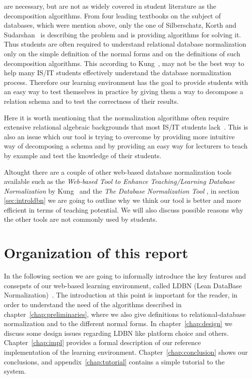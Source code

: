 are necessary, but are not as widely covered in student literature as the 
decomposition algorithms. From four leading textbooks on the subject of 
databases, which were mention above, only the one of Silberschatz, Korth and Sudarshan~\cite{bdb4}
is describing the problem and is providing algorithms for solving it. Thus students 
are often required to understand relational database normalization only on the 
simple definition of the normal forms and on the definitions of such decomposition
algorithms. This according to Kung~\cite{p8}, may not be the best way to help many 
IS/IT students effectively understand the database normalization process. Therefore
our learning environment has the goal to provide students with an easy way 
to test themselves
in practice by giving them a way to decompose a relation schema and to 
test the correctness of their results. 

Here it is worth mentioning that the normalization algorithms often require 
extensive relational algebraic backgrounds that most IS/IT students lack~\cite{p8}. This
is also an issue which our tool is trying to overcome by providing more intuitive 
way of decomposing a schema and by providing an easy way for lecturers to
teach by example and test the knowledge of their students. 

Altought there are a couple of other web-based database normalization tools 
available such as the \textit{Web-based Tool to Enhance Teaching/Learning Database 
Normalization} by Kung~\cite{p8} and the \textit{The Database Normalization Tool}
\cite{w1}, 
in section \ref{sec:introldbn} we are going to outline why we think our tool is better 
and more efficient
in terms of teaching potential. We will also discuss possible reasons why the 
other tools are not commonly used by students. 

\section{Organization of this report}
\label{sec:organization}
In the following section we are going to informally introduce 
the key features and consepsts of our web-based learning environment, 
called LDBN (Lean DataBase Normalization)~\cite{wldbn}. 
The introduction at this point is important for the reader,
in order to understand the need of the algorithms described in 
chapter~\ref{chap:preliminaries}, where we also give definitions to
relational-database normalization and to the different normal forms. 
In chapter~\ref{chap:design} we discuss some design issues regarding LDBN like 
platform choice and others. Chapter~\ref{chap:impl} provides a formal description
of our reference implementation of the learning environment. 
Chapter~\ref{chap:conclusion} shows our conclusions, and 
appendix~\ref{chap:tutorial} contains a simple tutorial to the system.


